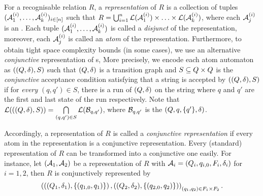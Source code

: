 For a recognisable relation $R$, a \emph{representation} of $R$ is a collection of tuples $(\mathcal{A}^{(i)}_1, \ldots, \mathcal{A}^{(i)}_k)_{i\in [n]}$  such that 
$R = \bigcup_{i=1}^n \mathcal{L}(\mathcal{A}^{(i)}_1) \times \ldots\times \mathcal{L}(\mathcal{A}^{(i)}_k)$, where each $\mathcal{A}^{(i)}_j$ is an \FA. 
Each tuple $(\mathcal{A}^{(i)}_1, \ldots, \mathcal{A}^{(i)}_k)$ is called a \emph{disjunct} of the representation, moreover, each \FA{} $\mathcal{A}^{(i)}_j$ is called an \emph{atom} of the representation.
%
Furthermore, to obtain tight space complexity bounds (in some cases), we use an alternative  \emph{conjunctive} representation of \FA{}s, %
More precisely, we encode each atom automaton as $((Q, \delta), S)$ such that $(Q, \delta)$ is a transition graph and $S \subseteq Q \times Q$ is the \emph{conjunctive} acceptance condition satisfying that a string is accepted by $((Q, \delta), S)$ if for \emph{every} $(q, q') \in S$, there is a run of $(Q, \delta)$ on the string where $q$ and $q'$ are the first and last state of the run respectively. 
%
Note that $\mathcal{L}(((Q, \delta), S)) = \bigcap \limits_{(q,q') \in S} \mathcal{L}(\mathcal{B}_{q,q'})$, where $\mathcal{B}_{q,q'}$ is the \FA{} $(Q, q, \{q'\}, \delta)$.
%

Accordingly, a representation of $R$ is called a \emph{conjunctive representation} if every atom in the representation is a conjunctive representation.
Every (standard) representation of $R$  can be transformed into a conjunctive one easily. For instance, let $(\mathcal{A}_1, \mathcal{A}_2)$ be a representation of $R$ with $\mathcal{A}_i = (Q_i, q_{i,0}, F_i, \delta_i)$ for $i=1,2$, then $R$ is conjunctively represented by 
%
$$\left(\left((Q_1, \delta_1), \{(q_{1,0}, q_1)\}\right), \left((Q_2, \delta_2), \{(q_{2,0}, q_2)\} \right)\right)_{(q_1, q_2) \in F_1 \times  F_2}.$$

%

